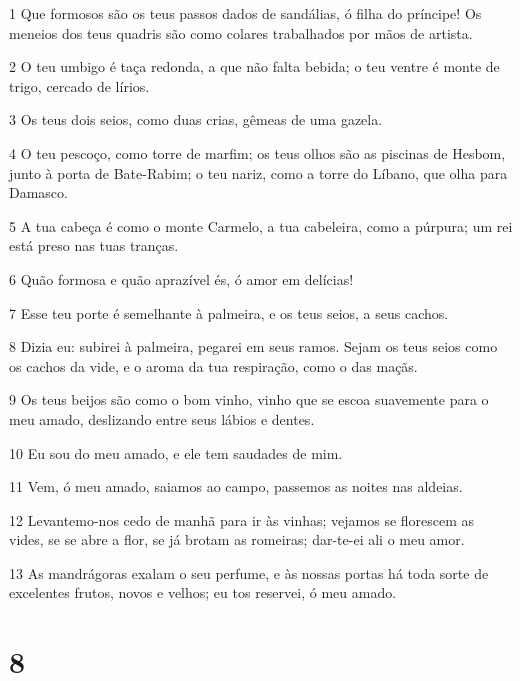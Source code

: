 \par 1 Que formosos são os teus passos dados de sandálias, ó filha do príncipe! Os meneios dos teus quadris são como colares trabalhados por mãos de artista.
\par 2 O teu umbigo é taça redonda, a que não falta bebida; o teu ventre é monte de trigo, cercado de lírios.
\par 3 Os teus dois seios, como duas crias, gêmeas de uma gazela.
\par 4 O teu pescoço, como torre de marfim; os teus olhos são as piscinas de Hesbom, junto à porta de Bate-Rabim; o teu nariz, como a torre do Líbano, que olha para Damasco.
\par 5 A tua cabeça é como o monte Carmelo, a tua cabeleira, como a púrpura; um rei está preso nas tuas tranças.
\par 6 Quão formosa e quão aprazível és, ó amor em delícias!
\par 7 Esse teu porte é semelhante à palmeira, e os teus seios, a seus cachos.
\par 8 Dizia eu: subirei à palmeira, pegarei em seus ramos. Sejam os teus seios como os cachos da vide, e o aroma da tua respiração, como o das maçãs.
\par 9 Os teus beijos são como o bom vinho, vinho que se escoa suavemente para o meu amado, deslizando entre seus lábios e dentes.
\par 10 Eu sou do meu amado, e ele tem saudades de mim.
\par 11 Vem, ó meu amado, saiamos ao campo, passemos as noites nas aldeias.
\par 12 Levantemo-nos cedo de manhã para ir às vinhas; vejamos se florescem as vides, se se abre a flor, se já brotam as romeiras; dar-te-ei ali o meu amor.
\par 13 As mandrágoras exalam o seu perfume, e às nossas portas há toda sorte de excelentes frutos, novos e velhos; eu tos reservei, ó meu amado.

\chapter{8}

